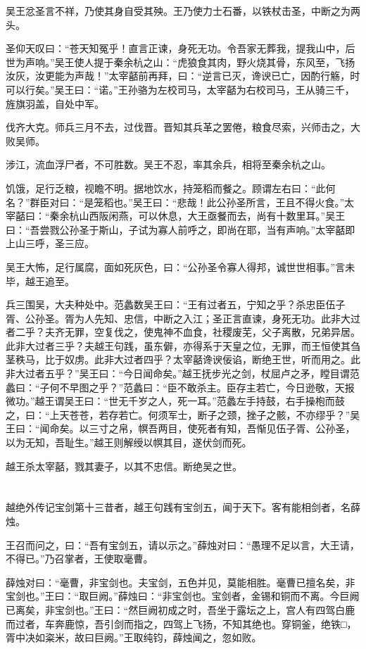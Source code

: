 \documentclass[12pt,UTF8]{ctexbook}
\begin{document}
吴王忿圣言不祥，乃使其身自受其殃。王乃使力士石番，以铁杖击圣，中断之为两头。

圣仰天叹曰：“苍天知冤乎！直言正谏，身死无功。令吾家无葬我，提我山中，后世为声响。”吴王使人提于秦余杭之山：“虎狼食其肉，野火烧其骨，东风至，飞扬汝灰，汝更能为声哉！”太宰嚭前再拜，曰：“逆言已灭，谗谀已亡，因酌行觞，时可以行矣。”吴王曰：“诺。”王孙骆为左校司马，太宰嚭为右校司马，王从骑三千，旌旗羽盖，自处中军。

伐齐大克。师兵三月不去，过伐晋。晋知其兵革之罢倦，粮食尽索，兴师击之，大败吴师。

涉江，流血浮尸者，不可胜数。吴王不忍，率其余兵，相将至秦余杭之山。

饥饿，足行乏粮，视瞻不明。据地饮水，持笼稻而餐之。顾谓左右曰：“此何名？”群臣对曰：“是笼稻也。”吴王曰：“悲哉！此公孙圣所言，王且不得火食。”太宰嚭曰：“秦余杭山西阪闲燕，可以休息，大王亟餐而去，尚有十数里耳。”吴王曰：“吾尝戮公孙圣于斯山，子试为寡人前呼之，即尚在耶，当有声响。”太宰嚭即上山三呼，圣三应。

吴王大怖，足行属腐，面如死灰色，曰：“公孙圣令寡人得邦，诚世世相事。”言未毕，越王追至。

兵三围吴，大夫种处中。范蠡数吴王曰：“王有过者五，宁知之乎？杀忠臣伍子胥、公孙圣。胥为人先知、忠信，中断之入江；圣正言直谏，身死无功。此非大过者二乎？夫齐无罪，空复伐之，使鬼神不血食，社稷废芜，父子离散，兄弟异居。此非大过者三乎？夫越王句践，虽东僻，亦得系于天皇之位，无罪，而王恒使其刍茎秩马，比于奴虏。此非大过者四乎？太宰嚭谗谀佞谄，断绝王世，听而用之。此非大过者五乎？”吴王曰：“今日闻命矣。”越王抚步光之剑，杖屈卢之矛，瞠目谓范蠡曰：“子何不早图之乎？”范蠡曰：“臣不敢杀主。臣存主若亡，今日逊敬，天报微功。”越王谓吴王曰：“世无千岁之人，死一耳。”范蠡左手持鼓，右手操枹而鼓之，曰：“上天苍苍，若存若亡。何须军士，断子之颈，挫子之骸，不亦缪乎？”吴王曰：“闻命矣。以三寸之帛，幎吾两目，使死者有知，吾惭见伍子胥、公孙圣，以为无知，吾耻生。”越王则解绶以幎其目，遂伏剑而死。

越王杀太宰嚭，戮其妻子，以其不忠信。断绝吴之世。


\part{}

越绝外传记宝剑第十三昔者，越王句践有宝剑五，闻于天下。客有能相剑者，名薛烛。

王召而问之，曰：“吾有宝剑五，请以示之。”薛烛对曰：“愚理不足以言，大王请，不得已。”乃召掌者，王使取毫曹。

薛烛对曰：“毫曹，非宝剑也。夫宝剑，五色并见，莫能相胜。毫曹已擅名矣，非宝剑也。”王曰：“取巨阙。”薛烛曰：“非宝剑也。宝剑者，金锡和铜而不离。今巨阙已离矣，非宝剑也。”王曰：“然巨阙初成之时，吾坐于露坛之上，宫人有四驾白鹿而过者，车奔鹿惊，吾引剑而指之，四驾上飞扬，不知其绝也。穿铜釜，绝铁□，胥中决如粢米，故曰巨阙。”王取纯钧，薛烛闻之，忽如败。
\end{document}

